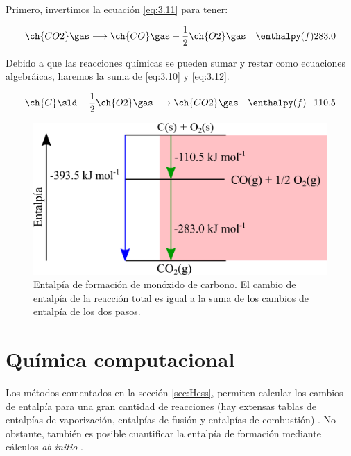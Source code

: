Primero, invertimos la ecuación \ref{eq:3.11} para tener:


\begin{equation}
\begin{aligned}
	& \ch{CO2}\gas \longrightarrow \ch{CO}\gas + \frac{1}{2}\ch{O2}\gas & \enthalpy(f){283.0}
\end{aligned}
\label{eq:3.12}
\end{equation}

Debido a que las reacciones químicas se pueden sumar y restar como ecuaciones algebráicas, haremos la suma de \ref{eq:3.10} y \ref{eq:3.12}.


\begin{equation}
\begin{aligned}
	& \ch{C}\sld + \frac{1}{2} \ch{O2}\gas \longrightarrow \ch{CO2}\gas & \enthalpy(f){-110.5}
\end{aligned}
\label{eq:3.13}
\end{equation}

\begin{figure}[H]
\begin{center}
\includegraphics[scale=0.6]{graphs/CO.png}
\caption[Figura de la entalpía de formación de monóxido de carbono.]{Entalpía de formación de monóxido de carbono. El cambio de entalpía de la reacción total es igual a la suma de los cambios de entalpía de los dos pasos.}
\label{CO}
\end{center}
\end{figure}

\section{Química computacional}
Los métodos comentados en la sección \ref{sec:Hess}, permiten calcular los cambios de entalpía para una gran cantidad de reacciones (hay extensas tablas de entalpías de vaporización, entalpías de fusión y entalpías de combustión) \cite{NIST1998, Tajti2004, Nicolaides1996}. No obstante, también es posible cuantificar la entalpía de formación mediante cálculos \textit{ab initio} \cite{Lewars2016}.\\

